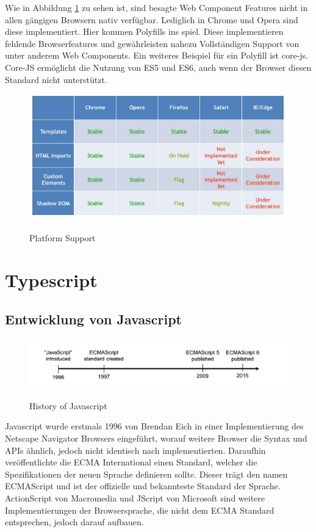 Wie in Abbildung \ref{fig:platform_support} zu sehen ist, sind besagte Web Component Features nicht in
allen gängigen Browsern nativ verfügbar. Lediglich in Chrome und Opera sind diese implementiert.
Hier kommen Polyfills ins spiel. Diese implementieren fehlende Browserfeatures und gewährleisten nahezu Vollständigen
Support von unter anderem Web Components. Ein weiteres Beispiel für ein Polyfill ist core-js.
Core-JS ermöglicht die Nutzung von ES5 und ES6, auch wenn der Browser diesen Standard nicht unterstützt.

\vspace{1cm}
\begin{figure}[ht]
 \centering
 \includegraphics[width=0.8\linewidth]{kapitel2/platform_support.jpg}
 \caption{Platform Support}\cite{WebCo43:online}
 \label{fig:platform_support}
\end{figure}


\section{Typescript}

\subsection{Entwicklung von Javascript}

\begin{figure}[ht]
 \centering
 \includegraphics[width=\linewidth]{kapitel2/javascript-timeline.png}
 \caption{History of Javascript}\cite[28]{EssentialTS}
\end{figure}

Javascript wurde erstmals 1996 von Brendan Eich in einer Implementierung des Netscape Navigator Browsers eingeführt,
worauf weitere Browser die Syntax und APIs ähnlich, jedoch nicht identisch nach implementierten.
Daraufhin veröffentlichte die ECMA International einen Standard, welcher die Spezifikationen der neuen Sprache
definieren sollte. Dieser trägt den namen ECMAScript und ist der offizielle und bekannteste Standard der
Sprache. ActionScript von Macromedia und JScript von Microsoft sind weitere Implementierungen der Browsersprache,
die nicht dem ECMA Standard entsprechen, jedoch darauf aufbauen.

